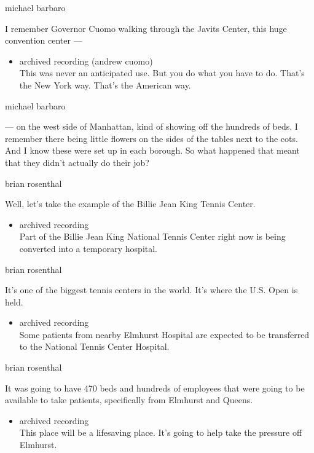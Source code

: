 michael barbaro

I remember Governor Cuomo walking through the Javits Center, this huge
convention center ---

\begin{itemize}
\tightlist
\item
  archived recording (andrew cuomo)\\
  This was never an anticipated use. But you do what you have to do.
  That's the New York way. That's the American way.
\end{itemize}

michael barbaro

--- on the west side of Manhattan, kind of showing off the hundreds of
beds. I remember there being little flowers on the sides of the tables
next to the cots. And I know these were set up in each borough. So what
happened that meant that they didn't actually do their job?

brian rosenthal

Well, let's take the example of the Billie Jean King Tennis Center.

\begin{itemize}
\tightlist
\item
  archived recording\\
  Part of the Billie Jean King National Tennis Center right now is being
  converted into a temporary hospital.
\end{itemize}

brian rosenthal

It's one of the biggest tennis centers in the world. It's where the U.S.
Open is held.

\begin{itemize}
\tightlist
\item
  archived recording\\
  Some patients from nearby Elmhurst Hospital are expected to be
  transferred to the National Tennis Center Hospital.
\end{itemize}

brian rosenthal

It was going to have 470 beds and hundreds of employees that were going
to be available to take patients, specifically from Elmhurst and Queens.

\begin{itemize}
\tightlist
\item
  archived recording\\
  This place will be a lifesaving place. It's going to help take the
  pressure off Elmhurst.
\end{itemize}

